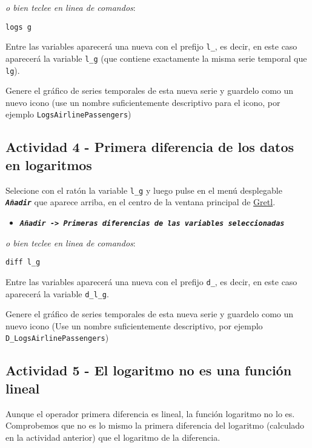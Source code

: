 \documentclass[11pt]{article}
\begin{document}
{\vspace{0pt} \footnotesize \color{gray!70!black}
\emph{o bien teclee en linea de comandos}: 
\begin{verbatim}
logs g
\end{verbatim}
}

Entre las variables aparecerá una nueva con el prefijo \texttt{l\_}, es decir,
en este caso aparecerá la variable \texttt{l\_g} (que contiene exactamente la
misma serie temporal que \texttt{lg}).

Genere el gráfico de series temporales de esta nueva serie y guardelo
como un nuevo icono (use un nombre suficientemente descriptivo para el
icono, por ejemplo \texttt{LogsAirlinePassengers})

\subsection{Actividad 4 - Primera diferencia de los datos en logaritmos}
\label{sec:org2444ac7}

Selecione con el ratón la variable \texttt{l\_g} y luego pulse en el menú desplegable \textbf{\emph{\texttt{Añadir}}} que aparece arriba, en el centro de la
ventana principal de \href{https://gretl.sourceforge.net/es.html}{Gretl}.
\begin{itemize}
\item \textbf{\emph{\texttt{Añadir -> Primeras diferencias de las variables seleccionadas}}}
\end{itemize}

{\vspace{0pt} \footnotesize \color{gray!70!black}
\emph{o bien teclee en linea de comandos}: 
\begin{verbatim}
diff l_g
\end{verbatim}
}

Entre las variables aparecerá una nueva con el prefijo \texttt{d\_}, es decir,
en este caso aparecerá la variable \texttt{d\_l\_g}.

Genere el gráfico de series temporales de esta nueva serie y guardelo
como un nuevo icono (Use un nombre suficientemente descriptivo, por
ejemplo \texttt{D\_LogsAirlinePassengers})

\subsection{Actividad 5 - El logaritmo no es una función lineal}
\label{sec:org6efa756}

Aunque el operador primera diferencia es lineal, la función logaritmo
no lo es. Comprobemos que no es lo mismo la primera diferencia del
logaritmo (calculado en la actividad anterior) que el logaritmo de la
diferencia.
\end{document}
